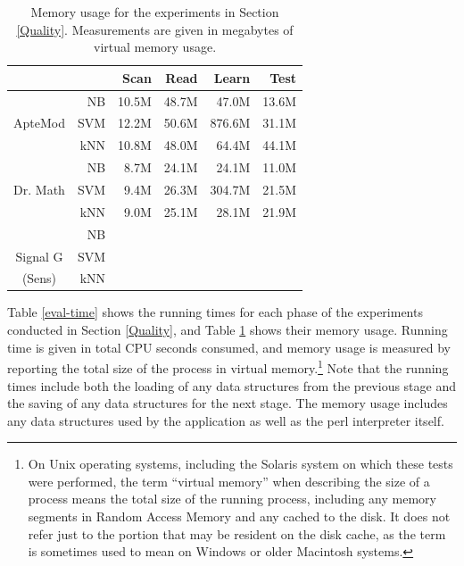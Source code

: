 \begin{table}
\begin{center}
\begin{tabular}{|c|r|r r r r|}
\cline{3-6}
\multicolumn{2}{c|}{}
                 &  Scan &  Read  & Learn  & Test  \\ \hline
           & NB  & 10.5M & 48.7M  & 47.0M  & 13.6M \\
ApteMod    & SVM & 12.2M & 50.6M  & 876.6M & 31.1M \\
           & kNN & 10.8M & 48.0M  & 64.4M  & 44.1M \\ \hline
           & NB  & 8.7M  & 24.1M  & 24.1M  & 11.0M \\
Dr. Math   & SVM & 9.4M  & 26.3M  & 304.7M & 21.5M \\
           & kNN & 9.0M  & 25.1M  & 28.1M  & 21.9M \\ \hline
           & NB  &   &   &   & \\
Signal G   & SVM &   &   &   & \\
  (Sens)   & kNN &   &   &   & \\ \hline
\end{tabular}
\end{center}
\caption[Memory usage for the experiments in Section \ref{Quality}]
 {Memory usage for the experiments in Section \ref{Quality}.
  Measurements are given in megabytes of virtual memory usage.}
\label{eval-memory}
\end{table}

Table \ref{eval-time} shows the running times for each phase of the
experiments conducted in Section \ref{Quality}, and Table
\ref{eval-memory} shows their memory usage.
Running time is given in total CPU seconds consumed,
and memory usage is measured by reporting the total size of the
process in virtual memory.\footnote{On Unix operating systems,
  including the Solaris system on which these tests were performed,
  the term ``virtual memory'' when describing the size of a process
  means the total size of the running process, including any memory
  segments in Random Access Memory and any cached to the disk.  It
  does not refer just to the portion that may be resident on the disk
  cache, as the term is sometimes used to mean on Windows or older
  Macintosh systems.}
Note that the running times include both
the loading of any data structures from the previous stage and the
saving of any data structures for the next stage.  The memory usage
includes any data structures used by the application as well as the
perl interpreter itself.

